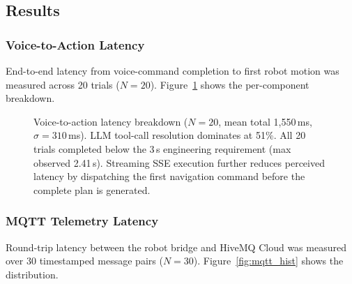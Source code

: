 \documentclass[11pt,a4paper]{article}
\begin{document}
\subsection{Results}
\label{sec:results}

\subsubsection{Voice-to-Action Latency}

End-to-end latency from voice-command completion to first robot motion was measured across 20 trials ($N=20$). Figure~\ref{fig:latency_bar} shows the per-component breakdown.

\begin{figure}[H]
\centering
{}
\caption{Voice-to-action latency breakdown ($N=20$, mean total 1{,}550\,ms, $\sigma=310$\,ms). LLM tool-call resolution dominates at 51\%. All 20 trials completed below the 3\,s engineering requirement (max observed 2.41\,s). Streaming SSE execution further reduces perceived latency by dispatching the first navigation command before the complete plan is generated.}
\label{fig:latency_bar}
\end{figure}

\subsubsection{MQTT Telemetry Latency}

Round-trip latency between the robot bridge and HiveMQ Cloud was measured over 30 timestamped message pairs ($N=30$). Figure~\ref{fig:mqtt_hist} shows the distribution.
\end{document}
